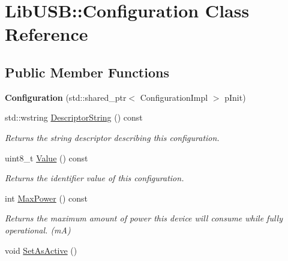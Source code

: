 \hypertarget{class_lib_u_s_b_1_1_configuration}{\section{Lib\-U\-S\-B\-:\-:Configuration Class Reference}
\label{class_lib_u_s_b_1_1_configuration}
}
\subsection*{Public Member Functions}
\begin{DoxyCompactItemize}
\item 
\hypertarget{class_lib_u_s_b_1_1_configuration_a85966788f5f320aba04c98eae92f8512}{{\bfseries Configuration} (std\-::shared\-\_\-ptr$<$ Configuration\-Impl $>$ p\-Init)}\label{class_lib_u_s_b_1_1_configuration_a85966788f5f320aba04c98eae92f8512}

\item 
\hypertarget{class_lib_u_s_b_1_1_configuration_ae1dd391b9d615ff1fe80264585527dda}{std\-::wstring \hyperlink{class_lib_u_s_b_1_1_configuration_ae1dd391b9d615ff1fe80264585527dda}{Descriptor\-String} () const }\label{class_lib_u_s_b_1_1_configuration_ae1dd391b9d615ff1fe80264585527dda}

\begin{DoxyCompactList}\small\item\em Returns the string descriptor describing this configuration. \end{DoxyCompactList}\item 
\hypertarget{class_lib_u_s_b_1_1_configuration_af50cb780a19692834d7c1c107602c24c}{uint8\-\_\-t \hyperlink{class_lib_u_s_b_1_1_configuration_af50cb780a19692834d7c1c107602c24c}{Value} () const }\label{class_lib_u_s_b_1_1_configuration_af50cb780a19692834d7c1c107602c24c}

\begin{DoxyCompactList}\small\item\em Returns the identifier value of this configuration. \end{DoxyCompactList}\item 
\hypertarget{class_lib_u_s_b_1_1_configuration_ae9dbfd1722338ebbccf8a772b5b8bed2}{int \hyperlink{class_lib_u_s_b_1_1_configuration_ae9dbfd1722338ebbccf8a772b5b8bed2}{Max\-Power} () const }\label{class_lib_u_s_b_1_1_configuration_ae9dbfd1722338ebbccf8a772b5b8bed2}

\begin{DoxyCompactList}\small\item\em Returns the maximum amount of power this device will consume while fully operational. (m\-A) \end{DoxyCompactList}\item 
\hypertarget{class_lib_u_s_b_1_1_configuration_a685c0454a10ebb8298f6fad0da7e5d02}{void \hyperlink{class_lib_u_s_b_1_1_configuration_a685c0454a10ebb8298f6fad0da7e5d02}{Set\-As\-Active} ()}\label{class_lib_u_s_b_1_1_configuration_a685c0454a10ebb8298f6fad0da7e5d02}


\end{DoxyCompactItemize}
